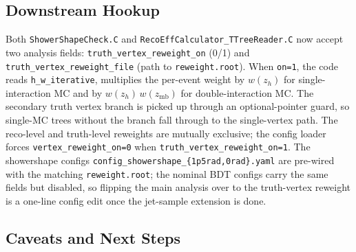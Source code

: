 \documentclass[11pt,a4paper]{article}
\begin{document}
\subsection{Downstream Hookup}
\label{subsec:hookup}

Both \texttt{ShowerShapeCheck.C} and
\texttt{RecoEffCalculator\_TTreeReader.C} now accept two analysis
fields: \texttt{truth\_vertex\_reweight\_on} (0/1) and
\texttt{truth\_vertex\_reweight\_file} (path to \texttt{reweight.root}).
When \texttt{on=1}, the code reads \texttt{h\_w\_iterative},
multiplies the per-event weight by $w(z_h)$ for single-interaction
MC and by $w(z_h)\,w(z_\mathrm{mb})$ for double-interaction MC. The
secondary truth vertex branch is picked up through an
optional-pointer guard, so single-MC trees without the branch fall
through to the single-vertex path. The reco-level and truth-level
reweights are mutually exclusive; the config loader forces
\texttt{vertex\_reweight\_on=0} when
\texttt{truth\_vertex\_reweight\_on=1}. The showershape configs
\texttt{config\_showershape\_\{1p5rad,0rad\}.yaml} are pre-wired
with the matching \texttt{reweight.root}; the nominal BDT configs
carry the same fields but disabled, so flipping the main analysis
over to the truth-vertex reweight is a one-line config edit once
the jet-sample extension is done.

\subsection{Caveats and Next Steps}
\label{subsec:iter_caveats}
\end{document}
